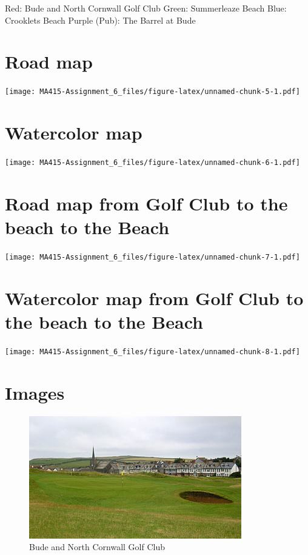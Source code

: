 \documentclass[]{article}
\begin{document}
Red: Bude and North Cornwall Golf Club Green: Summerleaze Beach Blue:
Crooklets Beach Purple (Pub): The Barrel at Bude

\section{Road map}\label{road-map}

\texttt{[image: MA415-Assignment\_6\_files/figure-latex/unnamed-chunk-5-1.pdf]}

\section{Watercolor map}\label{watercolor-map}

\texttt{[image: MA415-Assignment\_6\_files/figure-latex/unnamed-chunk-6-1.pdf]}

\section{Road map from Golf Club to the beach to the
Beach}\label{road-map-from-golf-club-to-the-beach-to-the-beach}

\texttt{[image: MA415-Assignment\_6\_files/figure-latex/unnamed-chunk-7-1.pdf]}

\section{Watercolor map from Golf Club to the beach to the
Beach}\label{watercolor-map-from-golf-club-to-the-beach-to-the-beach}

\texttt{[image: MA415-Assignment\_6\_files/figure-latex/unnamed-chunk-8-1.pdf]}

\section{Images}\label{images}

\begin{figure}
\centering
\includegraphics{golf.jpg}
\caption{Bude and North Cornwall Golf Club}
\end{figure}
\end{document}
